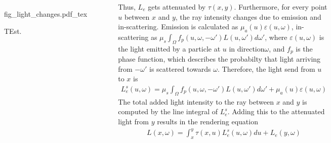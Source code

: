 \documentclass[20pt,,margin=1in,innermargin=-4.5in,blockverticalspace=-0.25in]{tikzposter}
\begin{document}
\begin{columns}
{    
    \begin{figure}\label{fig:light_changes}

\def\svgwidth{0.25\columnwidth}
  {fig_light_changes.pdf_tex}
  \caption{TEst.}
  \end{figure}
  
  
     Thus, $L_e$ gets attenuated by $\tau(x,y)$. Furthermore, for every point $u$ between $x$ and $y$, the ray intensity changes due to emission and in-scattering. Emission is calculated as $\mu_a(u)\varepsilon(u, \omega)$, in-scattering as $\mu_s\int_{\Omega}f_p(u,\omega,-\omega')L(u,\omega')d\omega'$, where $\varepsilon(u,\omega)$ is the light emitted by a particle at $u$ in direction$\omega$, and $f_p$ is the phase function, which describes the probabilty that light arriving from $-\omega'$ is scattered towards $\omega$. 
     \newline
     Therefore, the light send from $u$ to $x$ is 
     \begin{align*}
     L_e^s(u,\omega) = \mu_s\int_{\Omega}f_p(u,\omega,-\omega')L(u,\omega')d\omega' + \mu_a(u)\varepsilon(u, \omega)
     \end{align*}
     The total added light intensity to the ray between $x$ and $y$ is computed by the line integral of $L_e^s$. Adding this to the attenuated light from $y$  results in the rendering equation
     \begin{align*}
     L(x, \omega) = \int_{x}^{y}\tau(x,u)L_e^s(u,\omega)du + L_e(y,\omega)
     \end{align*} 
    }

    

    
\end{columns}
\end{document}
